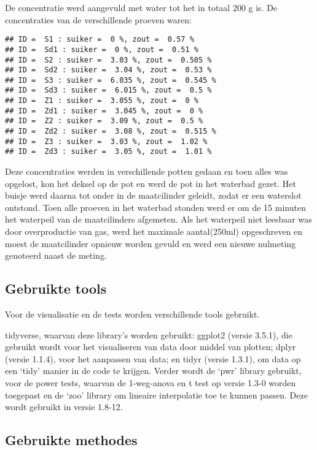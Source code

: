 \documentclass[
]{article}
\begin{document}
De concentratie werd aangevuld met water tot het in totaal 200 g is. De concentraties van de verschillende proeven waren:

\begin{verbatim}
## ID =  S1 : suiker =  0 %, zout =  0.57 %
## ID =  Sd1 : suiker =  0 %, zout =  0.51 %
## ID =  S2 : suiker =  3.03 %, zout =  0.505 %
## ID =  Sd2 : suiker =  3.04 %, zout =  0.53 %
## ID =  S3 : suiker =  6.035 %, zout =  0.545 %
## ID =  Sd3 : suiker =  6.015 %, zout =  0.5 %
## ID =  Z1 : suiker =  3.055 %, zout =  0 %
## ID =  Zd1 : suiker =  3.045 %, zout =  0 %
## ID =  Z2 : suiker =  3.09 %, zout =  0.5 %
## ID =  Zd2 : suiker =  3.08 %, zout =  0.515 %
## ID =  Z3 : suiker =  3.03 %, zout =  1.02 %
## ID =  Zd3 : suiker =  3.05 %, zout =  1.01 %
\end{verbatim}

Deze concentraties werden in verschillende potten gedaan en toen alles was opgelost, kon het deksel op de pot en werd de pot in het waterbad gezet. Het buisje werd daarna tot onder in de maatcilinder geleidt, zodat er een waterslot ontstond. Toen alle proeven in het waterbad stonden werd er om de 15 minuten het waterpeil van de maatcilinders afgemeten. Als het waterpeil niet leesbaar was door overproductie van gas, werd het maximale aantal(250ml) opgeschreven en moest de maatcilinder opnieuw worden gevuld en werd een nieuwe nulmeting genoteerd naast de meting.

\subsection{Gebruikte tools}\label{gebruikte-tools}

Voor de visualisatie en de tests worden verschillende tools gebruikt.

tidyverse, waarvan deze library's worden gebruikt: ggplot2 (versie 3.5.1), die gebruikt wordt voor het visualiseren van data door middel van plotten; dplyr (versie 1.1.4), voor het aanpassen van data; en tidyr (versie 1.3.1), om data op een `tidy' manier in de code te krijgen.
Verder wordt de `pwr' library gebruikt, voor de power tests, waarvan de 1-weg-anova en t test op versie 1.3-0 worden toegepast en de `zoo' library om lineaire interpolatie toe te kunnen passen. Deze wordt gebruikt in versie 1.8-12.

\subsection{Gebruikte methodes}\label{gebruikte-methodes}
\end{document}
